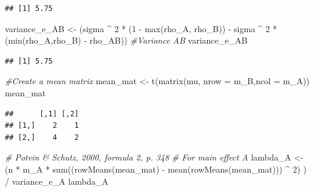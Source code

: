 \documentclass[
]{book}
\newenvironment{Shaded}{\begin{snugshade}}{\end{snugshade}}
\newcommand{\AttributeTok}[1]{\textcolor[rgb]{0.77,0.63,0.00}{#1}}
\newcommand{\CommentTok}[1]{\textcolor[rgb]{0.56,0.35,0.01}{\textit{#1}}}
\newcommand{\DecValTok}[1]{\textcolor[rgb]{0.00,0.00,0.81}{#1}}
\newcommand{\FunctionTok}[1]{\textcolor[rgb]{0.00,0.00,0.00}{#1}}
\newcommand{\NormalTok}[1]{#1}
\newcommand{\OtherTok}[1]{\textcolor[rgb]{0.56,0.35,0.01}{#1}}
\newcommand{\SpecialCharTok}[1]{\textcolor[rgb]{0.00,0.00,0.00}{#1}}
\begin{document}
\begin{verbatim}
## [1] 5.75
\end{verbatim}

\begin{Shaded}
\begin{Highlighting}[]
\NormalTok{variance\_e\_AB }\OtherTok{\textless{}{-}}
\NormalTok{  (sigma }\SpecialCharTok{\^{}} \DecValTok{2} \SpecialCharTok{*}\NormalTok{ (}\DecValTok{1} \SpecialCharTok{{-}} \FunctionTok{max}\NormalTok{(rho\_A, rho\_B)) }\SpecialCharTok{{-}} 
\NormalTok{     sigma }\SpecialCharTok{\^{}} \DecValTok{2} \SpecialCharTok{*}\NormalTok{ (}\FunctionTok{min}\NormalTok{(rho\_A,rho\_B) }\SpecialCharTok{{-}}\NormalTok{ rho\_AB)) }
\CommentTok{\#Variance AB}
\NormalTok{variance\_e\_AB}
\end{Highlighting}
\end{Shaded}

\begin{verbatim}
## [1] 5.75
\end{verbatim}

\begin{Shaded}
\begin{Highlighting}[]
\CommentTok{\#Create a mean matrix}
\NormalTok{mean\_mat }\OtherTok{\textless{}{-}} \FunctionTok{t}\NormalTok{(}\FunctionTok{matrix}\NormalTok{(mu, }\AttributeTok{nrow =}\NormalTok{ m\_B,}\AttributeTok{ncol =}\NormalTok{ m\_A)) }
\NormalTok{mean\_mat}
\end{Highlighting}
\end{Shaded}

\begin{verbatim}
##      [,1] [,2]
## [1,]    2    1
## [2,]    4    2
\end{verbatim}

\begin{Shaded}
\begin{Highlighting}[]
\CommentTok{\# Potvin \& Schutz, 2000, formula 2, p. 348}
\CommentTok{\# For main effect A}
\NormalTok{lambda\_A }\OtherTok{\textless{}{-}}
\NormalTok{  (n }\SpecialCharTok{*}\NormalTok{ m\_A }\SpecialCharTok{*} \FunctionTok{sum}\NormalTok{((}\FunctionTok{rowMeans}\NormalTok{(mean\_mat) }\SpecialCharTok{{-}} 
                   \FunctionTok{mean}\NormalTok{(}\FunctionTok{rowMeans}\NormalTok{(mean\_mat))) }\SpecialCharTok{\^{}} \DecValTok{2}\NormalTok{) ) }\SpecialCharTok{/}\NormalTok{ variance\_e\_A}
\NormalTok{  lambda\_A}
\end{Highlighting}
\end{Shaded}
\end{document}
